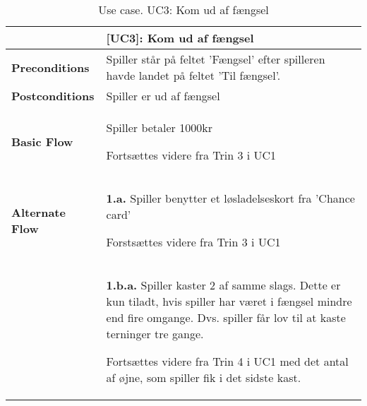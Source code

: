 \documentclass[class=article, crop=false]{standalone}
\begin{document}
    \begin{table}[H]
        \caption{Use case. UC3: Kom ud af fængsel}
        \begin{tabularx}{\textwidth}{|l|X|}
            \hline
            & \textbf{[UC3]: Kom ud af fængsel}   \\ \hline
            \textbf{Preconditions}       & Spiller står på feltet 'Fængsel' efter spilleren havde landet på feltet 'Til fængsel'. \\ \hline
            \textbf{Postconditions}      & Spiller er ud af fængsel \\ \hline


            \textbf{Basic Flow} & \begin{tabenum}
                                      \item Spiller betaler 1000kr
                                      \item Fortsættes videre fra Trin 3 i UC1
            \end{tabenum}   \\ \hline


            \textbf{Alternate Flow}  & \textbf{1.a.} Spiller benytter et løsladelseskort fra 'Chance card'
                                    \begin{enumerate} \begin{tabenum}
                                                          \item Forstsættes videre fra Trin 3 i UC1
                                    \end{tabenum} \end{enumerate}
                                    \\


                                   & \textbf{1.b.a.} Spiller kaster 2 af samme slags. Dette er kun tiladt, hvis spiller har været i fængsel mindre end fire omgange. Dvs. spiller får lov til at kaste terninger tre gange.
            \begin{enumerate} \begin{tabenum}
                                  \item Fortsættes videre fra Trin 4 i UC1 med det antal af øjne, som spiller fik i det sidste kast.
            \end{tabenum} \end{enumerate}
            \\






\end{tabularx}
\end{table}
\end{document}
